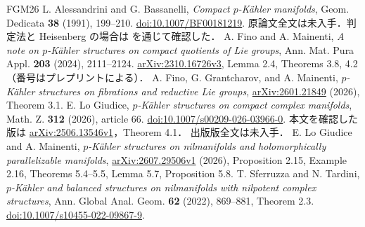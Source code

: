 \documentclass[12pt]{amsart}
\theoremstyle{definition}
\theoremstyle{remark}
\numberwithin{equation}{section}
\begin{document}
\begin{thebibliography}{FGM26}
 L. Alessandrini and G. Bassanelli,
\emph{Compact $p$-K\"ahler manifolds}, Geom. Dedicata \textbf{38} (1991),
199--210. \href{https://doi.org/10.1007/BF00181219}{doi:10.1007/BF00181219}.
原論文全文は未入手．判定法と Heisenberg の場合は
\cite[Proposition 2.15, Example 2.16]{ja:LM} を通じて確認した．
 A. Fino and A. Mainenti,
\emph{A note on $p$-K\"ahler structures on compact quotients of Lie groups},
Ann. Mat. Pura Appl. \textbf{203} (2024), 2111--2124.
\href{https://arxiv.org/abs/2310.16726v3}{arXiv:2310.16726v3},
Lemma 2.4, Theorems 3.8, 4.2（番号はプレプリントによる）．
 A. Fino, G. Grantcharov, and A. Mainenti,
\emph{$p$-K\"ahler structures on fibrations and reductive Lie groups},
\href{https://arxiv.org/abs/2601.21849}{arXiv:2601.21849} (2026), Theorem 3.1.
 E. Lo Giudice,
\emph{$p$-K\"ahler structures on compact complex manifolds},
Math. Z. \textbf{312} (2026), article 66.
\href{https://doi.org/10.1007/s00209-026-03966-0}{doi:10.1007/s00209-026-03966-0}.
本文を確認した版は \href{https://arxiv.org/abs/2506.13546v1}{arXiv:2506.13546v1}，Theorem 4.1．
出版版全文は未入手．
 E. Lo Giudice and A. Mainenti,
\emph{$p$-K\"ahler structures on nilmanifolds and holomorphically parallelizable manifolds},
\href{https://arxiv.org/abs/2607.29506v1}{arXiv:2607.29506v1} (2026),
Proposition 2.15, Example 2.16, Theorems 5.4--5.5, Lemma 5.7,
Proposition 5.8.
 T. Sferruzza and N. Tardini,
\emph{$p$-K\"ahler and balanced structures on nilmanifolds with nilpotent complex structures},
Ann. Global Anal. Geom. \textbf{62} (2022), 869--881, Theorem 2.3.
\href{https://doi.org/10.1007/s10455-022-09867-9}{doi:10.1007/s10455-022-09867-9}.
\end{thebibliography}
\end{document}
